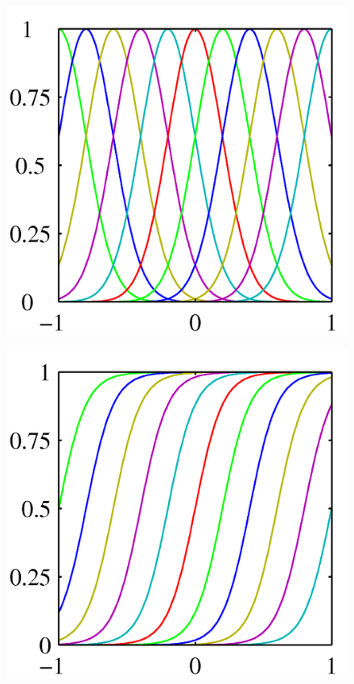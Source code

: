 \documentclass[b5paper]{book}
\numberwithin{equation}{chapter}
\begin{document}
{\begin{figure}[ht]
\begin{minipage}[t]{0.3\linewidth}
		\includegraphics[scale=0.8]{Images/3-1b.png}
		\label{fig:3-1b}
		\end{minipage}
		\begin{minipage}[t]{0.3\linewidth}
		\centering
		\includegraphics[scale=0.8]{Images/3-1c.png}
		\label{fig:3-1c}

\end{minipage}
\end{figure}}
\end{document}
